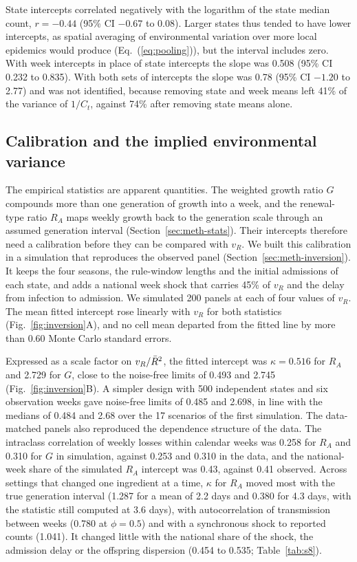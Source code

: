 State intercepts correlated negatively with the logarithm of the state median count, $r=-0.44$ (95\% CI $-0.67$ to 0.08). Larger states thus tended to have lower intercepts, as spatial averaging of environmental variation over more local epidemics would produce (Eq.~(\ref{eq:pooling})), but the interval includes zero. With week intercepts in place of state intercepts the slope was 0.508 (95\% CI 0.232 to 0.835). With both sets of intercepts the slope was 0.78 (95\% CI $-1.20$ to 2.77) and was not identified, because removing state and week means left 41\% of the variance of $1/C_t$, against 74\% after removing state means alone.

\subsection{Calibration and the implied environmental variance}
\label{sec:res-sim}

The empirical statistics are apparent quantities. The weighted growth ratio $G$ compounds more than one generation of growth into a week, and the renewal-type ratio $R_A$ maps weekly growth back to the generation scale through an assumed generation interval (Section~\ref{sec:meth-stats}). Their intercepts therefore need a calibration before they can be compared with $v_R$. We built this calibration in a simulation that reproduces the observed panel (Section~\ref{sec:meth-inversion}). It keeps the four seasons, the rule-window lengths and the initial admissions of each state, and adds a national week shock that carries 45\% of $v_R$ and the delay from infection to admission. We simulated 200 panels at each of four values of $v_R$. The mean fitted intercept rose linearly with $v_R$ for both statistics (Fig.~\ref{fig:inversion}A), and no cell mean departed from the fitted line by more than 0.60 Monte Carlo standard errors.

Expressed as a scale factor on $v_R/\bar{R}^2$, the fitted intercept was $\kappa=0.516$ for $R_A$ and 2.729 for $G$, close to the noise-free limits of 0.493 and 2.745 (Fig.~\ref{fig:inversion}B). A simpler design with 500 independent states and six observation weeks gave noise-free limits of 0.485 and 2.698, in line with the medians of 0.484 and 2.68 over the 17 scenarios of the first simulation. The data-matched panels also reproduced the dependence structure of the data. The intraclass correlation of weekly losses within calendar weeks was 0.258 for $R_A$ and 0.310 for $G$ in simulation, against 0.253 and 0.310 in the data, and the national-week share of the simulated $R_A$ intercept was 0.43, against 0.41 observed. Across settings that changed one ingredient at a time, $\kappa$ for $R_A$ moved most with the true generation interval (1.287 for a mean of 2.2 days and 0.380 for 4.3 days, with the statistic still computed at 3.6 days), with autocorrelation of transmission between weeks (0.780 at $\phi=0.5$) and with a synchronous shock to reported counts (1.041). It changed little with the national share of the shock, the admission delay or the offspring dispersion (0.454 to 0.535; Table~\ref{tab:s8}).

